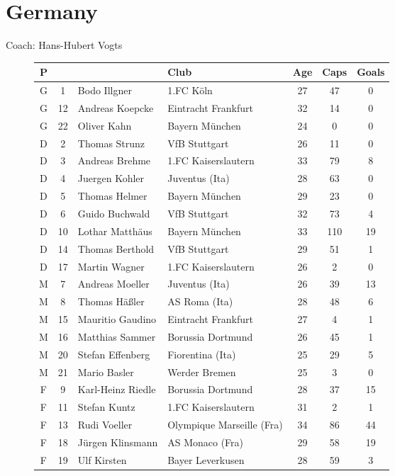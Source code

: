 \chapter{Germany}
\newline
\newline
Coach: Hans-Hubert Vogts
\begin{figure}[H]
\begin{tabular}{c c l l c c c}
P & & & Club & Age & Caps & Goals \\ \hline
G & 1 & Bodo Illgner & 1.FC K{\"o}ln & 27 & 47 & 0 \\
G & 12 & Andreas Koepcke & Eintracht Frankfurt & 32 & 14 & 0 \\
G & 22 & Oliver Kahn & Bayern M{\"u}nchen & 24 & 0 & 0 \\ \hline
D &  2 & Thomas Strunz & VfB Stuttgart & 26 & 11 & 0 \\
D &  3 & Andreas Brehme & 1.FC Kaiserslautern & 33 & 79 & 8 \\
D &  4 & Juergen Kohler & Juventus (Ita) & 28 & 63 & 0 \\ 
D &  5 & Thomas Helmer & Bayern M{\"u}nchen & 29 & 23 & 0 \\
D &  6 & Guido Buchwald & VfB Stuttgart & 32 & 73 & 4 \\
D & 10 & Lothar Matth{\"a}us & Bayern M{\"u}nchen & 33 & 110 & 19 \\
D & 14 & Thomas Berthold & VfB Stuttgart & 29 & 51 & 1 \\
D & 17 & Martin Wagner & 1.FC Kaiserslautern & 26 & 2 & 0\\ \hline
M & 7 & Andreas Moeller & Juventus (Ita) & 26 & 39 & 13 \\
M &  8 & Thomas H{\"a}{\ss}ler &  AS Roma (Ita) & 28 & 48 & 6 \\
M & 15 & Mauritio Gaudino & Eintracht Frankfurt & 27 & 4 & 1 \\
M & 16 & Matthias Sammer &  Borussia Dortmund & 26 & 45 & 1 \\
M & 20 & Stefan Effenberg & Fiorentina (Ita) & 25 & 29 & 5 \\
M & 21 & Mario Basler & Werder Bremen & 25 & 3 & 0\\ \hline
F & 9 & Karl-Heinz Riedle & Borussia Dortmund & 28 & 37 & 15 \\
F & 11 & Stefan Kuntz & 1.FC Kaiserslautern & 31 & 2 & 1 \\ 
F & 13 & Rudi Voeller & Olympique Marseille (Fra) & 34 & 86 & 44 \\
F & 18 & J{\"u}rgen Klinsmann & AS Monaco (Fra) & 29 & 58 & 19 \\
F & 19 & Ulf Kirsten & Bayer Leverkusen & 28 & 59 & 3\\ \hline
\end{tabular}
\end{figure}
